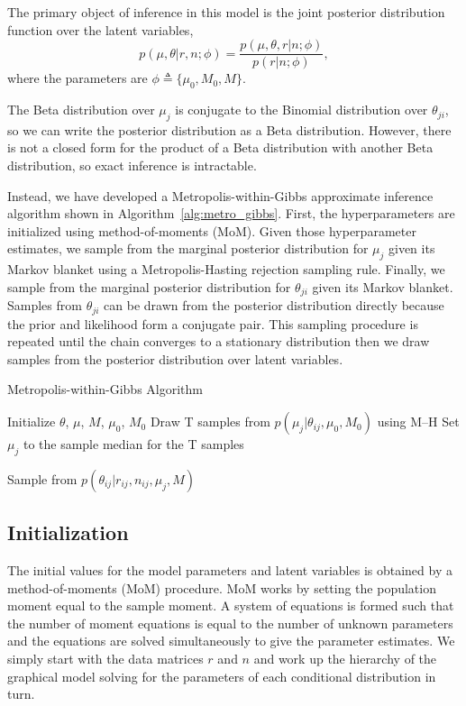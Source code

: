 \documentclass[11pt,reqno]{amsart}
\begin{document}
The primary object of inference in this model is the joint posterior distribution function over the latent variables,
\begin{equation}
	p(\mu, \theta | r, n; \phi)  = \frac{ p(\mu, \theta, r | n; \phi) } {p ( r | n; \phi)},
\end{equation}
where the parameters are $\phi \triangleq \{\mu_0, M_0, M\}$.

The Beta distribution over $\mu_j$ is conjugate to the Binomial distribution over $\theta_{ji}$, so we can write the posterior distribution as a Beta distribution. However, there is not a closed form for the product of a Beta distribution with another Beta distribution, so exact inference is intractable.

Instead, we have developed a Metropolis-within-Gibbs  approximate inference algorithm shown in Algorithm~\ref{alg:metro_gibbs}. First, the hyperparameters are initialized using method-of-moments (MoM). Given those hyperparameter estimates, we sample from the marginal posterior distribution for $\mu_j$ given its Markov blanket using a Metropolis-Hasting rejection sampling rule. Finally, we sample from the marginal posterior distribution for $\theta_{ji}$ given its Markov blanket. Samples from $\theta_{ji}$ can be drawn from the posterior distribution directly  because the prior and likelihood form a conjugate pair. This sampling procedure is repeated until the chain converges to a stationary distribution then we draw samples from the posterior distribution over latent variables.

\begin{algorithm}[ht]
\caption{Metropolis-within-Gibbs Algorithm}
\label{alg:metro_gibbs}
\begin{algorithmic}[1]

\State Initialize $\theta$, $\mu$, $M$, $\mu_0$, $M_0$
\Repeat
{} 
  \State Draw T samples from $p \left( \mu_j |\theta_{ij},\mu_0,M_0\right)$ using M--H
  \State Set $\mu_j$ to the sample median for the T samples
  
  
   
	\State Sample from $p \left( \theta_{ij} |r_{ij},n_{ij},\mu_j,M \right)$
  \EndFor

\EndFor
{}
\end{algorithmic}
\end{algorithm}

\subsection{Initialization}
The initial values for the model parameters and latent variables is obtained by a method-of-moments (MoM) procedure. MoM works by setting the population moment equal to the sample moment. A system of equations is formed such that the number of moment equations is equal to the number of unknown parameters and the equations are solved simultaneously to give the parameter estimates. We simply start with the data matrices $r$ and $n$ and work up the hierarchy of the graphical model solving for the parameters of each conditional distribution in turn.
\end{document}
